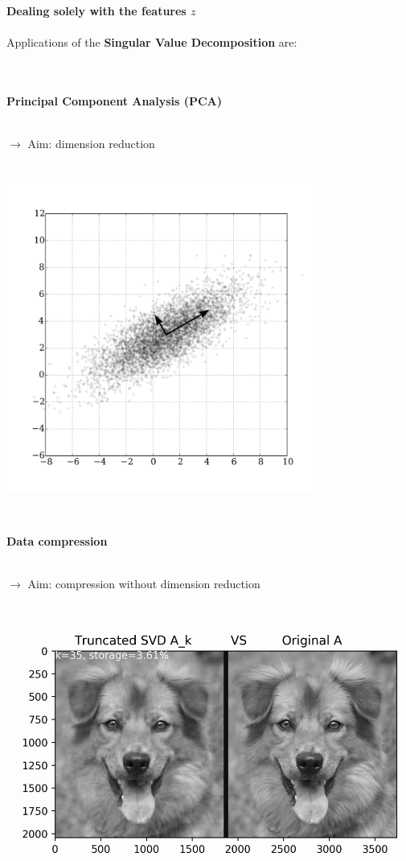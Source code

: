 \begin{frame}[c]
	\textbf{\large  Dealing solely with the features $z$}~~\\~\\
	Applications of the \textbf{Singular Value Decomposition} are:\\
	~\\~\\
	\begin{minipage}[t]{0.48\textwidth}
		\textbf{Principal Component Analysis (PCA)}\\~\\
		{\raggedright
			$\rightarrow$ Aim: dimension reduction\\~\\}
		{\centering\includegraphics[width=0.77\textwidth]{media/PCA.png}}
	\end{minipage}
	~~~~~
	\begin{minipage}[t]{0.48\textwidth}
		\textbf{Data compression}\\~\\
		\raggedright
		$\rightarrow$ Aim: compression without dimension reduction\\~\\
		{ \hspace*{-0.6cm}\centering\includegraphics[width=1.1\textwidth]{media/SVD_dog.png}}
	\end{minipage}
\end{frame}
